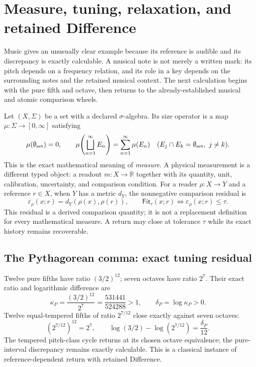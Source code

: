 \documentclass[10pt]{article}
\newcommand{\R}{\mathbb R}
\begin{document}
\section{Measure, tuning, relaxation, and retained Difference}\label{sec:tuning}
Music gives an unusually clear example because its reference is audible and its discrepancy is exactly calculable. A musical note is not merely a written mark: its pitch depends on a frequency relation, and its role in a key depends on the surrounding notes and the retained musical context. The next calculation begins with the pure fifth and octave, then returns to the already-established musical and atomic comparison wheels.


Let $(X,\Sigma)$ be a set with a declared $\sigma$-algebra. Its size operator is a map $\mu:\Sigma\to[0,\infty]$ satisfying
\begin{equation}
\mu(\emptyset_{\rm set})=0,\qquad
\mu\!\left(\bigsqcup_{n=1}^{\infty}E_n\right)=\sum_{n=1}^{\infty}\mu(E_n)
\quad(E_j\cap E_k=\emptyset_{\rm set},\ j\ne k).
\end{equation}
This is the exact mathematical meaning of \emph{measure}. A physical measurement is a different typed object: a readout $m:X\to\R$ together with its quantity, unit, calibration, uncertainty, and comparison condition. For a reader $\rho:X\to Y$ and a reference $r\in X$, when $Y$ has a metric $d_Y$, the nonnegative comparison residual is
\begin{equation}\varepsilon_\rho(x;r)=d_Y(\rho(x),\rho(r)),\qquad \mathsf{Fit}_\tau(x;r)\iff\varepsilon_\rho(x;r)\le\tau.\end{equation}
This residual is a derived comparison quantity; it is not a replacement definition for every mathematical measure. A return may close at tolerance $\tau$ while its exact history remains recoverable.

\subsection*{The Pythagorean comma: exact tuning residual}
Twelve pure fifths have ratio $(3/2)^{12}$; seven octaves have ratio $2^7$. Their exact ratio and logarithmic difference are
\begin{equation}\kappa_P=\frac{(3/2)^{12}}{2^7}=\frac{531441}{524288}>1,\qquad \delta_P=\log\kappa_P>0.\end{equation}
Twelve equal-tempered fifths of ratio $2^{7/12}$ close exactly against seven octaves:
\begin{equation}(2^{7/12})^{12}=2^7,\qquad \log(3/2)-\log(2^{7/12})=\frac{\delta_P}{12}.\end{equation}
The tempered pitch-class cycle returns at its chosen octave equivalence; the pure-interval discrepancy remains exactly calculable. This is a classical instance of reference-dependent return with retained Difference.
\end{document}
